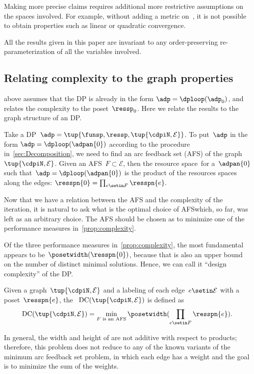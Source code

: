 \begin{remark}
    Making more precise claims requires additional more restrictive assumptions on the spaces involved.
    For example, without adding a metric on~\ressp, it is not possible to obtain properties such as linear or quadratic convergence.
\end{remark}

\begin{remark}
    All the results given in this paper are invariant to any order-preserving re-parameterization of all the variables involved.
\end{remark}

\subsection{Relating complexity to the graph properties}

 above assumes that the DP is already in the form $\adp=\dploop(\adp_{0})$, and relates the complexity to the poset~$\ressp_{0}$.
Here we relate the results to the graph structure of an DP.

Take a DP~$\adp=\tup{ \funsp,\ressp,\tup{ \cdpiN,\mathcal{E}} } $.
To put~$\adp$ in the form $\adp=\dploop(\adpan{0})$ according to the procedure in~\cref{sec:Decomposition}, we need to find an arc feedback set (AFS) of the graph~$\tup{ \cdpiN,\mathcal{E}} $.
Given an AFS~$F\subset\mathcal{E}$, then the resource space~\ressp for a~$\adpan{0}$ such that~$\adp=\dploop(\adpan{0})$ is the product of the resources spaces along the edges: $\resspn{0}=\prod_{e\setin F}\resspn{e}.
$

Now that we have a relation between the AFS and the complexity of the iteration, it is natural to ask what is the optimal choice of AFS\textemdash which, so far, was left as an arbitrary choice.
The AFS should be chosen as to minimize one of the performance measures in~\cref{prop:complexity}.

Of the three performance measures in~\cref{prop:complexity}, the most fundamental appears to be~$\posetwidth(\resspn{0})$, because that is also an upper bound on the number of distinct minimal solutions.
Hence, we can call it ``design complexity'' of the DP.
\begin{definition}
    \label{def:design-complexity}
    Given a graph~$\tup{ \cdpiN,\mathcal{E}}$ and a labeling of each edge~$e\setin\mathcal{E}$ with a poset~$\resspn{e}$, the ~$\text{DC}(\tup{ \cdpiN,\mathcal{E}} )$ is defined as
    \begin{equation}
        \text{DC}(\tup{ \cdpiN,\mathcal{E}} )=\min_{F\text{ is an AFS}}\posetwidth(\prod_{e\setin F}\resspn{e}).
        \label{eq:complexity}
    \end{equation}
\end{definition}
In general, the width and height of  are not additive with respect to products; therefore, this problem does not reduce to any of the known variants of the minimum arc feedback set problem, in which each edge has a weight and the goal is to minimize the sum of the weights.

